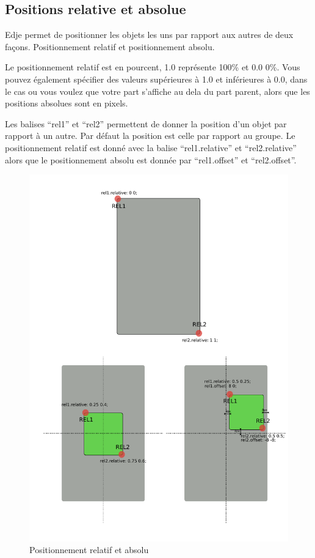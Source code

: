 \documentclass[a4paper]{efr}
\begin{document}
\subsection{Positions relative et absolue}

Edje permet de positionner les objets les uns par rapport aux autres de deux
façons. Positionnement relatif et positionnement absolu.

Le positionnement relatif est en pourcent, 1.0 représente 100\% et 0.0 0\%. Vous
pouvez également spécifier des valeurs supérieures à 1.0 et inférieures à 0.0,
dans le cas ou vous voulez que votre part s'affiche au dela du part parent,
alors que les positions absolues sont en pixels.

Les balises ``rel1'' et ``rel2'' permettent de donner la position d'un objet par rapport
à un autre. Par défaut la position est celle par rapport au groupe.
Le positionnement relatif est donné avec la balise ``rel1.relative'' et
``rel2.relative'' alors que le positionnement absolu est donnée par ``rel1.offset'' et
``rel2.offset''.

\begin{figure}
  \begin{center}
    \includegraphics[scale=0.7]{images/rel1rel2.pdf}
  \end{center}
  \caption{Positionnement relatif et absolu}
\end{figure}
\end{document}
